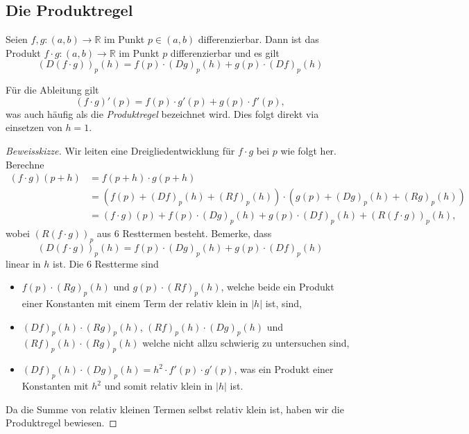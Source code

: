 \documentclass[../main.tex]{subfiles}
\begin{document}
\subsection*{Die Produktregel}
\begin{productrule}
Seien $f, g \colon (a, b) \to \mathbb{R}$ 
im Punkt $p \in (a, b)$ differenzierbar.
Dann ist das Produkt
$f \cdot g \colon (a, b) \to \mathbb{R}$ 
im Punkt $p$ differenzierbar und es gilt
\[
  {(D(f \cdot g))}_p(h) = f(p) \cdot
  {(Dg)}_p(h) + g(p) \cdot {(Df)}_p(h)
\]
\end{productrule}

\begin{remark}
  Für die Ableitung gilt
  \[
    {(f\cdot g)}'(p) = f(p) \cdot g'(p) + g(p) \cdot f'(p),
  \]
  was auch häufig als die \emph{Produktregel}
  bezeichnet wird.
  Dies folgt direkt via einsetzen von $h = 1$.
\end{remark}

\begin{proof}[Beweisskizze]
  Wir leiten eine Dreigliedentwicklung für $f \cdot g$ 
  bei $p$ wie folgt her. Berechne
  \begin{align*}
    (f \cdot g) (p+h)
    & = f(p+h) \cdot g(p+h)\\
    &= \left( f(p) + {(Df)}_p(h) + {(Rf)}_p(h) \right)
    \cdot \left( g(p) + {(Dg)}_p(h) + {(Rg)}_p(h) \right) \\
    &= (f \cdot g)(p)
    + f(p) \cdot {(Dg)}_p(h) + g(p) \cdot {(Df)}_p(h)
    + {(R(f \cdot g))}_p(h),
  \end{align*}
  wobei ${(R(f \cdot g))}_p$ aus $6$ Resttermen
  besteht.
  Bemerke, dass
  \[
    {(D(f \cdot g))}_p(h) = f(p) \cdot {(Dg)}_p(h)
    + g(p) \cdot {(Df)}_p(h)
  \]
  linear in $h$ ist.
  Die $6$ Restterme sind
  \begin{itemize}
    \item $f(p) \cdot {(Rg)}_p(h)$ und
      $g(p) \cdot {(Rf)}_p(h)$, welche beide
      ein Produkt einer Konstanten
      mit einem Term der relativ klein in $|h|$ ist, sind,
    \item ${(Df)}_p(h) \cdot {(Rg)}_p(h)$,
      ${(Rf)}_p(h) \cdot {(Dg)}_p(h)$ und
      ${(Rf)}_p(h) \cdot {(Rg)}_p(h)$
      welche nicht allzu schwierig zu untersuchen sind,
    \item ${(Df)}_p(h) \cdot {(Dg)}_p(h) = h^2
      \cdot f'(p) \cdot g'(p)$, was ein Produkt
      einer Konstanten
      mit $h^2$ und somit relativ klein in $|h|$ ist.
  \end{itemize}
  Da die Summe von relativ kleinen Termen selbst relativ
  klein ist, haben wir die Produktregel bewiesen.
\end{proof}
\end{document}
